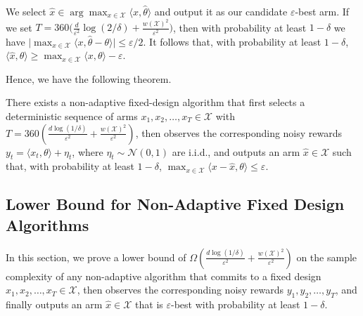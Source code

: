 We select $\widehat{x}\in\arg\max_{x\in\mathcal{X}}\langle x,\widehat{\theta}\rangle$ and output it as our candidate $\varepsilon$-best arm.
If we set $T=360\bigl(\tfrac{d}{\varepsilon^2}\log(2/\delta)+\tfrac{w(\mathcal{X})^2}{\varepsilon^2}\bigr)$, then with probability at least $1-\delta$ we have
$\bigl|\max_{x\in\mathcal{X}}\langle x,\widehat{\theta}-\theta\rangle\bigr|\le \varepsilon/2$.
It follows that, with probability at least $1-\delta$,
$\langle \widehat{x},\theta\rangle \ge \max_{x\in\mathcal{X}}\langle x,\theta\rangle - \varepsilon$.


Hence, we have the following theorem.
\begin{theorem}\label{thm:adaptive-upper-bound-algo}
There exists a non-adaptive fixed-design algorithm that first selects a deterministic sequence of arms $x_1,x_2,\ldots,x_T\in\mathcal{X}$ with $T=360\!\left(\frac{d\log(1/\delta)}{\varepsilon^2}+\frac{w(\mathcal{X})^2}{\varepsilon^2}\right)$, then observes the corresponding noisy rewards $y_t=\langle x_t,\theta\rangle+\eta_t$, where $\eta_t\sim\mathcal{N}(0,1)$ are i.i.d., and outputs an arm $\widehat{x}\in\mathcal{X}$ such that, with probability at least $1-\delta$, $\max_{x\in\mathcal{X}} \langle x-\widehat{x},\theta\rangle \le \varepsilon$.
\end{theorem}



 
\subsection{Lower Bound for Non-Adaptive Fixed Design Algorithms}\label{sec:lower}
In this section, we prove a lower bound of $\Omega\!\left(\frac{d\log(1/\delta)}{\varepsilon^2}+\frac{w(\mathcal{X})^2}{\varepsilon^2}\right)$ on the sample complexity of any non-adaptive algorithm that commits to a fixed design $x_1,x_2,\ldots,x_T\in\mathcal{X}$, then observes the corresponding noisy rewards $y_1,y_2,\ldots,y_T$, and finally outputs an arm $\widehat{x}\in\mathcal{X}$ that is $\varepsilon$-best with probability at least $1-\delta$.

